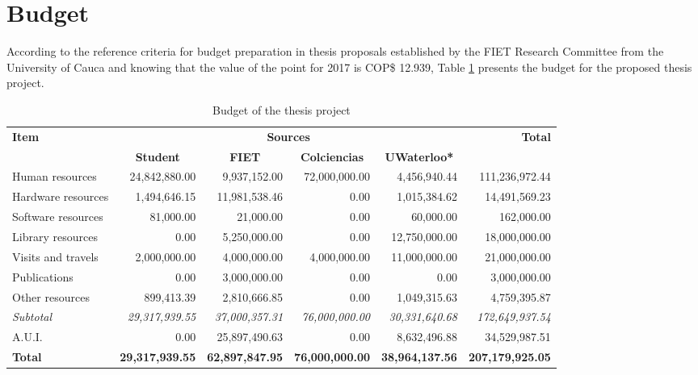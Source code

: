 \section{Budget}
\label{sec:budget}

According to the reference criteria for budget preparation in thesis proposals established by the FIET Research Committee from the University of Cauca and knowing that the value of the point for 2017 is COP\$ 12.939, Table \ref{tab:budget} presents the budget for the proposed thesis project.

\begin{table}[!ht]
    \centering
    \scriptsize
    \begin{tabular}{|l|r|r|r|r|r|}
        
        \hline
        \multirow{2}{0.2\textwidth}{\centering\textbf{Item}} & \multicolumn{4}{|c|}{\textbf{Sources}} &  \multirow{2}{0.15\textwidth}{\centering\textbf{Total}} \\
        \cline{2-5}
        & \multicolumn{1}{|c|}{\textbf{Student}} & \multicolumn{1}{|c|}{\textbf{FIET}} & \multicolumn{1}{|c|}{\textbf{Colciencias}} & \multicolumn{1}{|c|}{\textbf{UWaterloo*}} & \\
        \hline
        
        \hline
        Human resources & 24,842,880.00 & 9,937,152.00 & 72,000,000.00 & 4,456,940.44 & 111,236,972.44 \\
        \hline
        Hardware resources & 1,494,646.15 & 11,981,538.46 & 0.00 & 1,015,384.62 & 14,491,569.23 \\
        \hline
        Software resources & 81,000.00 & 21,000.00 & 0.00 & 60,000.00 & 162,000.00 \\
        \hline
        Library resources & 0.00 & 5,250,000.00 & 0.00 & 12,750,000.00 & 18,000,000.00 \\
        \hline
        Visits and travels & 2,000,000.00 & 4,000,000.00 & 4,000,000.00 & 11,000,000.00 & 21,000,000.00 \\
        \hline
        Publications & 0.00 & 3,000,000.00 & 0.00 & 0.00 & 3,000,000.00 \\
        \hline
        Other resources & 899,413.39 & 2,810,666.85 & 0.00 & 1,049,315.63 & 4,759,395.87 \\
        \hline
        \textit{Subtotal} & \textit{29,317,939.55} & \textit{37,000,357.31} & \textit{76,000,000.00} & \textit{30,331,640.68} & \textit{172,649,937.54} \\
        \hline
        A.U.I. & 0.00 & 25,897,490.63 & 0.00 & 8,632,496.88 & 34,529,987.51 \\
        \hline
        \textbf{Total} & \textbf{29,317,939.55} & \textbf{62,897,847.95} & \textbf{76,000,000.00} & \textbf{38,964,137.56} & \textbf{207,179,925.05} \\
        \hline
        
        
    \end{tabular}
    \caption{Budget of the thesis project}
    \label{tab:budget}
\end{table}
